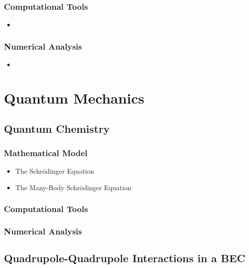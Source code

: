 \documentclass{report}
\begin{document}
        \subsection{Computational Tools}

            \begin{itemize}
                \item 
            \end{itemize}

        \subsection{Numerical Analysis}

            \begin{itemize}
                \item 
            \end{itemize}

\chapter{Quantum Mechanics} \label{sec:quantum}

    \section{Quantum Chemistry}

        \subsection{Mathematical Model}

            \begin{itemize}
                \item The Schr{\"o}dinger Equation
                \item The Many-Body Schr{\"o}dinger Equation
            \end{itemize}

        \subsection{Computational Tools}

        \subsection{Numerical Analysis}

    \section{Quadrupole-Quadrupole Interactions in a BEC}
\end{document}
